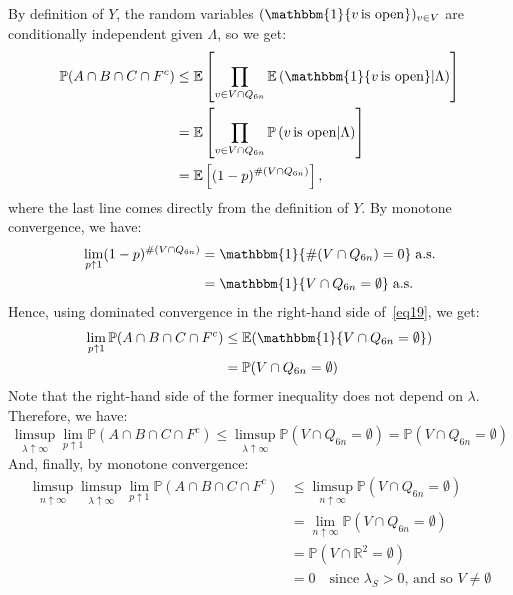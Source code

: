 \documentclass[10pt,a4paper]{amsart}
\theoremstyle{exampstyle}
\theoremstyle{exampnotations}
\begin{document}
By definition of $Y$, the random variables $(\mathbbm{1} \lbrace v \, \text{is open} \rbrace )_{v \in V}$ are conditionally independent given $\Lambda$, so we get:
\begin{align}
    \nonumber \mathbb{P}(A \cap B \cap C \cap F^c) &\leq \mathbb{E}\left[\prod_{v \in V \cap Q_{6n}}\mathbb{E}\left( \mathbbm{1}\lbrace v \, \text{is open} \rbrace \vert \Lambda \right)\right]
    \\ \nonumber &= \mathbb{E}\left[\prod_{v \in V \cap Q_{6n}}\mathbb{P}\left( v \, \text{is open} \vert \Lambda \right)\right]
    \\ \label{eq19} &= \mathbb{E}\left[(1-p)^{\#(V \cap Q_{6n})}\right], 
\end{align}
where the last line comes directly from the definition of $Y$. By monotone convergence, we have:
\begin{align*}
  \lim_{p \uparrow 1}(1-p)^{\#(V \cap Q_{6n})} &= \mathbbm{1}\lbrace \#(V \cap Q_{6n}) = 0 \rbrace \; \text{a.s.}
  \\ &= \mathbbm{1}\lbrace V \cap Q_{6n} = \emptyset \rbrace \; \text{a.s.}  
\end{align*}
Hence, using dominated convergence in the right-hand side of~\eqref{eq19}, we get:
\begin{align*}
\lim_{p \uparrow 1} \mathbb{P}(A \cap B \cap C \cap F^c) &\leq \mathbb{E}(\mathbbm{1}\lbrace V \cap Q_{6n} = \emptyset \rbrace)
\\ &= \mathbb{P}(V \cap Q_{6n} = \emptyset)
\end{align*}
Note that the right-hand side of the former inequality does not depend on $\lambda$. Therefore, we have: \begin{equation*}
    \limsup_{\lambda \uparrow \infty}\lim_{p \uparrow 1} \mathbb{P}(A \cap B \cap C \cap F^c) \leq \limsup_{\lambda \uparrow \infty} \mathbb{P}(V \cap Q_{6n} = \emptyset) = \mathbb{P}(V \cap Q_{6n} = \emptyset)
\end{equation*}
And, finally, by monotone convergence:
\begin{align*}
\limsup_{n \uparrow \infty}\limsup_{\lambda \uparrow \infty}\lim_{p \uparrow 1} \mathbb{P}(A \cap B \cap C \cap F^c) &\leq \limsup_{n \uparrow \infty} \mathbb{P}(V \cap Q_{6n} = \emptyset) \\ &= \lim_{n \uparrow \infty} \mathbb{P}(V \cap Q_{6n} = \emptyset)
\\ &= \mathbb{P}(V \cap \mathbb{R}^{2} = \emptyset)
\\ &= 0 \quad \text{since $\lambda_{S} > 0$, and so $V \neq \emptyset$}
\end{align*}
\end{document}
